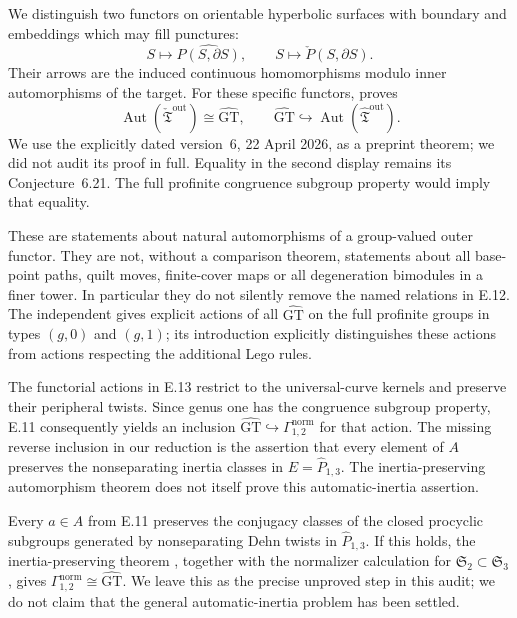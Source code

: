 We distinguish two functors on orientable hyperbolic surfaces with
boundary and embeddings which may fill punctures:
\[
 S\longmapsto\widehat{P(S,\partial S)},\qquad
 S\longmapsto\check P(S,\partial S).
\]
Their arrows are the induced continuous homomorphisms modulo inner
automorphisms of the target.  For these specific functors,
\citet[\S2.8, Theorem~6.23 and Corollary~6.24]{Boggi2026Automorphisms}
proves
\[
 \operatorname{Aut}(\check{\mathfrak T}^{\mathrm{out}})
       \cong\widehat{\mathrm{GT}},\qquad
 \widehat{\mathrm{GT}}\hookrightarrow
       \operatorname{Aut}(\widehat{\mathfrak T}^{\mathrm{out}}).
\]
We use the explicitly dated version~6, 22 April 2026, as a preprint
theorem; we did not audit its proof in full.  Equality in the second
display remains its Conjecture~6.21.  The full profinite congruence
subgroup property would imply that equality.

These are statements about natural automorphisms of a group-valued
outer functor.  They are not, without a comparison theorem, statements
about all base-point paths, quilt moves, finite-cover maps or all
degeneration bimodules in a finer tower.  In particular they do not
silently remove the named relations in E.12.  The independent
\citet[Theorem~1.1]{LochakNakamuraSchneps2026} gives explicit actions of
all $\widehat{\mathrm{GT}}$ on the full profinite groups in types
$(g,0)$ and $(g,1)$; its introduction explicitly distinguishes these
actions from actions respecting the additional Lego rules.

The functorial actions in E.13 restrict to the universal-curve kernels
and preserve their peripheral twists.  Since genus one has the
congruence subgroup property, E.11 consequently yields an inclusion
$\widehat{\mathrm{GT}}\hookrightarrow\Gamma^{\mathrm{norm}}_{1,2}$
for that action.  The missing reverse inclusion in our reduction is the
assertion that every element of $A$ preserves the nonseparating inertia
classes in $E=\widehat P_{1,3}$.  The inertia-preserving automorphism
theorem does not itself prove this automatic-inertia assertion.

Every $a\in A$ from E.11 preserves the conjugacy classes of the closed
procyclic subgroups generated by nonseparating Dehn twists in
$\widehat P_{1,3}$.  If this holds, the inertia-preserving theorem
\citet[Theorem~A(ii)]{Boggi2026Automorphisms}, together with the
normalizer calculation for $\mathfrak S_2\subset\mathfrak S_3$, gives
$\Gamma^{\mathrm{norm}}_{1,2}\cong\widehat{\mathrm{GT}}$.
We leave this as the precise unproved step in this audit; we do not
claim that the general automatic-inertia problem has been settled.

